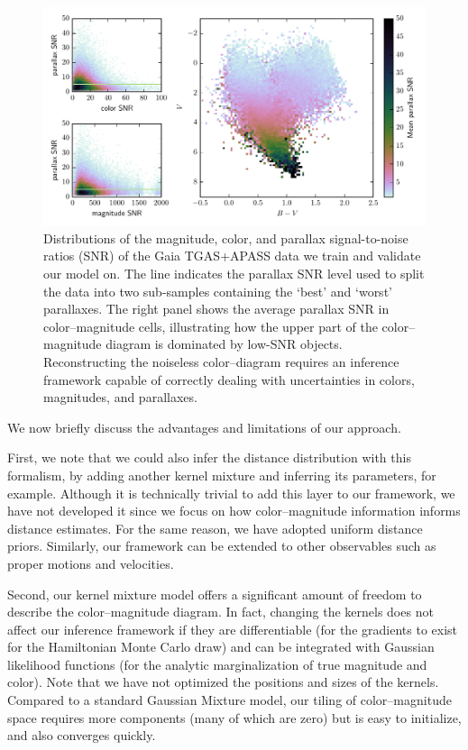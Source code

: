 \documentclass[manuscript, letterpaper]{aastex6}
\begin{document}
\begin{figure}
\hspace*{-3mm}\includegraphics[width=15.75cm]{datasummary.pdf}
\caption{Distributions of the magnitude, color, and parallax signal-to-noise ratios (SNR) of the Gaia TGAS+APASS data we train and validate our model on. The line indicates the parallax SNR level used to split the data into two sub-samples containing the `best' and `worst' parallaxes. The right panel shows the average parallax SNR in color--magnitude cells, illustrating how the upper part of the color--magnitude diagram is dominated by low-SNR objects. Reconstructing the noiseless color--diagram requires an inference framework capable of correctly dealing with uncertainties in colors, magnitudes, and parallaxes.}
\label{fig:datasummary}
\end{figure}

We now briefly discuss the advantages and limitations of our approach.

First, we note that we could also infer the distance distribution with this formalism, by adding another kernel mixture and inferring its parameters, for example. 
Although it is technically trivial to add this layer to our framework, we have not developed it since we focus on how color--magnitude information informs distance estimates.
For the same reason, we have adopted uniform distance priors.
Similarly, our framework can be extended to other observables such as proper motions and velocities.

Second, our kernel mixture model offers a significant amount of freedom to describe the color--magnitude diagram.
In fact, changing the kernels does not affect our inference framework if they are differentiable (for the gradients to exist for the Hamiltonian Monte Carlo draw) and can be integrated with Gaussian likelihood functions (for the analytic marginalization of true magnitude and color).
Note that we have not optimized the positions and sizes of the kernels. 
Compared to a standard Gaussian Mixture model, our tiling of color--magnitude space requires more components (many of which are zero) but is easy to initialize, and also converges quickly. 
\end{document}

